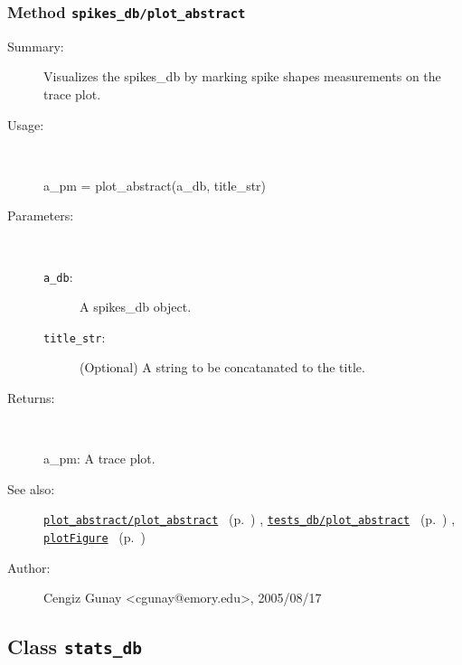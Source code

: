 \subsubsection[Method \texttt{plot\_abstract}]{Method \texttt{spikes\_db/plot\_abstract}}%
%
\label{ref_spikes_db__plot_abstract}%
\hypertarget{ref_spikes_db__plot_abstract}{}%
\begin{description}
\item[Summary:]Visualizes the spikes\_db by marking spike shapes measurements on the trace plot.
%
\item[Usage:]~%
\begin{lyxcode}%
a\_pm = plot\_abstract(a\_db, title\_str)
%
\end{lyxcode}%
%
%
\item[Parameters:]~
\begin{description}%
\item[\texttt{a\_db}:]
 A spikes\_db object.
\item[\texttt{title\_str}:]
 (Optional) A string to be concatanated to the title.
\end{description}%
%
\item[Returns:]~

	a\_pm: A trace plot.
%
%
\item[See also:]%
\hyperlink{ref_plot_abstract__plot_abstract}{\texttt{plot\_abstract/plot\_abstract}}%
\ (p.~\pageref{ref_plot_abstract__plot_abstract})%
%
, \hyperlink{ref_tests_db__plot_abstract}{\texttt{tests\_db/plot\_abstract}}%
\ (p.~\pageref{ref_tests_db__plot_abstract})%
%
, \hyperlink{ref_plotFigure}{\texttt{plotFigure}}%
\ (p.~\pageref{ref_plotFigure})%
%
%
\item[Author:]%
Cengiz Gunay <cgunay@emory.edu>, 2005/08/17%
\end{description}
\methodline%
\subsection{Class \texttt{stats\_db}}%
%
\label{ref_stats_db}%
\hypertarget{ref_stats_db}{}%
